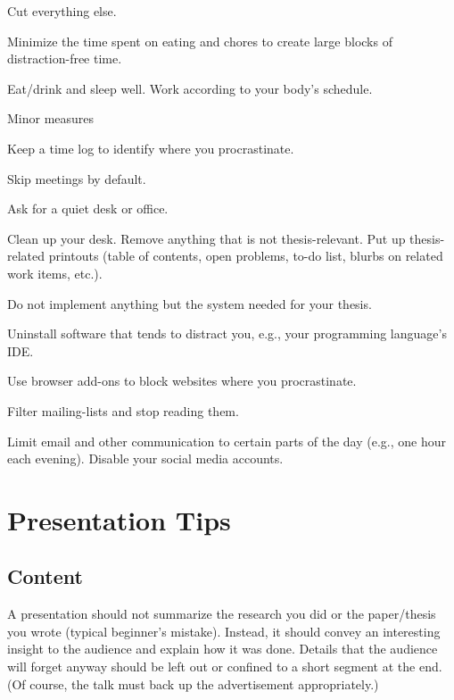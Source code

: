 \documentclass[12pt]{article}
\begin{document}
\begin{compactitem}
\begin{compactitem}
Cut everything else.
\item Minimize the time spent on eating and chores to create large blocks of distraction-free time.
\item Eat/drink and sleep well. Work according to your body's schedule.
\end{compactitem}
\item Minor measures
\begin{compactitem}
\item Keep a time log to identify where you procrastinate.
\item Skip meetings by default.
\item Ask for a quiet desk or office.
\item Clean up your desk. Remove anything that is not thesis-relevant. Put up thesis-related printouts (table of contents, open problems, to-do list, blurbs on related work items, etc.).
\item Do not implement anything but the system needed for your thesis.
\item Uninstall software that tends to distract you, e.g., your programming language's IDE.
\item Use browser add-ons to block websites where you procrastinate.
\item Filter mailing-lists and stop reading them.
\item Limit email and other communication to certain parts of the day (e.g., one hour each evening).
Disable your social media accounts.
\end{compactitem}
\end{compactitem}



\section{Presentation Tips}

\subsection{Content}

A presentation should not summarize the research you did or the paper/thesis you wrote (typical beginner's mistake).
Instead, it should convey an interesting insight to the audience and explain how it was done.
Details that the audience will forget anyway should be left out or confined to a short segment at the end.
(Of course, the talk must back up the advertisement appropriately.)
\medskip
\end{document}
